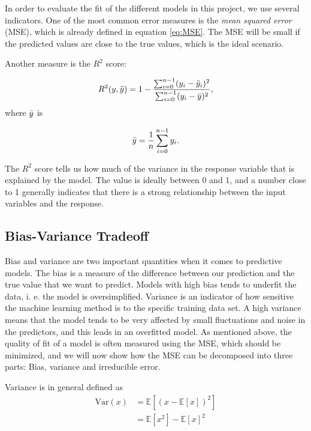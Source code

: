 In order to evaluate the fit of the different models in this project, we use several indicators. One of the most common error measures is the \textit{mean squared error} (MSE), which is already defined in equation \ref{eq:MSE}. The MSE will be small if the predicted values are close to the true values, which is the ideal scenario.

Another measure is the $R^2$ score\cite[p. 70]{james}:

\begin{align}
    R^2 (y, \Tilde{y}) = 1 - \frac{\sum_{i=0}^{n-1}(y_i - \Tilde{y}_i)^2}{\sum_{i=0}^{n-1}(y_i - \Bar{y})^2},
\end{align}
where $\Bar{y}$ is

\begin{align}
    \Bar{y} = \frac{1}{n} \sum_{i=0}^{n-1} y_i.
\end{align}

The $R^2$ score tells us how much of the variance in the response variable that is explained by the model. The value is ideally between 0 and 1, and a number close to 1 generally indicates that there is a strong relationship between the input variables and the response.

\subsection{Bias-Variance Tradeoff}

Bias and variance are two important quantities when it comes to predictive models. The bias is a measure of the difference between our prediction and the true value that we want to predict. Models with high bias tends to underfit the data, i. e. the model is oversimplified. Variance is an indicator of how sensitive the machine learning method is to the specific training data set. A high variance means that the model tends to be very affected by small fluctuations and noise in the predictors, and this leads in an overfitted model. As mentioned above, the quality of fit of a model is often measured using the MSE, which should be minimized, and we will now show how the MSE can be decomposed into three parts: Bias, variance and irreducible error.

Variance is in general defined as
\begin{align}    
    \label{eq:var1}
    \text{Var}(x) &= \mathbb{E}\left[(x - \mathbb{E}[x])^2\right]\\
    &= \mathbb{E}[x^2] - \mathbb{E}[x]^2
    \label{eq:var2}
\end{align}



